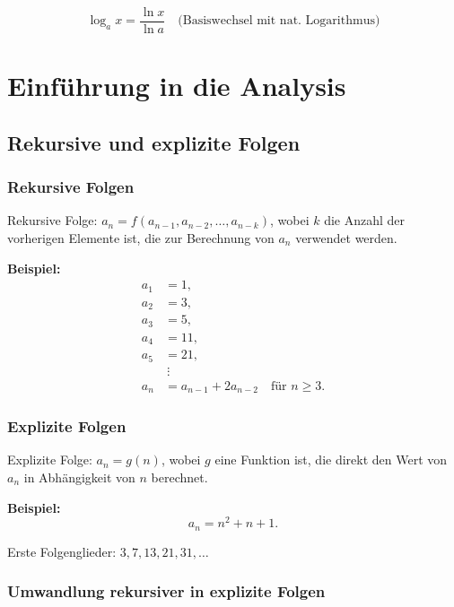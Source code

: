 \documentclass[11pt, openany]{book}
\begin{document}
\vspace{1em}
\begin{equation*}
    \log_a{x} = \frac{\ln{x}}{\ln{a}} \quad \text{(Basiswechsel mit nat. Logarithmus)}
\end{equation*}

\newpage


\chapter{Einführung in die Analysis}

\section{Rekursive und explizite Folgen}

\subsection{Rekursive Folgen}

Rekursive Folge: $a_n = f(a_{n-1}, a_{n-2}, \dots, a_{n-k})$, wobei $k$ die Anzahl der vorherigen Elemente ist, die zur Berechnung von $a_n$ verwendet werden.

\textbf{Beispiel:}
\begin{align*}
    a_1 &= 1, \\
    a_2 &= 3, \\
    a_3 &= 5, \\
    a_4 &= 11, \\
    a_5 &= 21, \\
    &\ \vdots \\
    a_n &= a_{n-1} + 2a_{n-2} \quad \text{für } n \geq 3.
\end{align*}

\subsection{Explizite Folgen}

Explizite Folge: $a_n = g(n)$, wobei $g$ eine Funktion ist, die direkt den Wert von $a_n$ in Abhängigkeit von $n$ berechnet.

\textbf{Beispiel:}
\[
    a_n = n^2 + n + 1.
\]

Erste Folgenglieder: $3, 7, 13, 21, 31, \dots$

\subsection{Umwandlung rekursiver in explizite Folgen}
\end{document}
